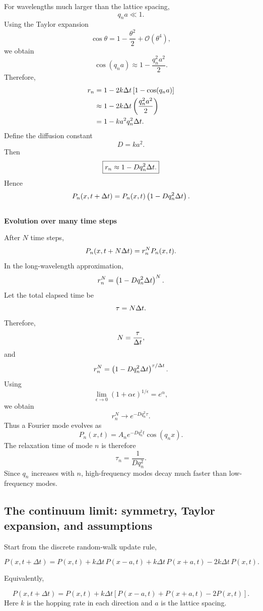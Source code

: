 For wavelengths much larger than the lattice spacing,
\[
    q_na \ll 1.
\]
Using the Taylor expansion
\[
    \cos\theta = 1 - \frac{\theta^2}{2} + \mathcal{O}(\theta^4),
\]
we obtain
\[
    \cos(q_na) \approx 1 - \frac{q_n^2a^2}{2}.
\]
Therefore,
\begin{align*}
    r_n &= 1 - 2k\Delta t \left[ 1-\cos(q_na) \right]
    \\
    &\approx 1 - 2k\Delta t \left( \frac{q_n^2a^2}{2} \right)
    \\
    &= 1-ka^2q_n^2\Delta t.
\end{align*}
Define the diffusion constant
\[
    \boxed{ D = ka^2. }
\]
Then
\[
    \boxed{ r_n \approx 1-Dq_n^2\Delta t. }
\]
Hence
\[
    P_n(x,t + \Delta t) = P_n(x,t) \left( 1 - Dq_n^2 \Delta t \right).
\]
% 
% 
\medskip
\\
\textbf{Evolution over many time steps}

After $N$ time steps,
% 
\[
    P_n(x,t+N\Delta t) = r_n^N P_n(x,t).
\]
% 
In the long-wavelength approximation,
% 
\[
    r_n^N = \left( 1-Dq_n^2\Delta t \right)^N.
\]
% 
Let the total elapsed time be
% 
\[
    \tau = N\Delta t.
\]
% 
Therefore,
% 
\[
    N = \frac{\tau}{\Delta t},
\]
% 
and
% 
\[
    r_n^N = \left( 1-Dq_n^2\Delta t \right)^{\tau/\Delta t}.
\]
% 
Using
% 
\[
    \lim_{\epsilon\rightarrow0} (1+\alpha\epsilon)^{1/\epsilon} = e^\alpha,
\]
% 
we obtain
% 
\[
    \boxed{ r_n^N \longrightarrow e^{-Dq_n^2\tau}. }
\]
% 
Thus a Fourier mode evolves as
% 
\[
    \boxed{ P_n(x,t) = A_n e^{-Dq_n^2t} \cos(q_nx). }
\]
% 
The relaxation time of mode $n$ is therefore
% 
\[
    \tau_n = \frac{1}{Dq_n^2}.
\]
% 
Since $q_n$ increases with $n$, high-frequency modes decay much faster than low-frequency modes.



\subsection{The continuum limit: symmetry, Taylor expansion, and assumptions}
\label{deriv:continuum}


Start from the discrete random-walk update rule,

\[
    P(x,t+\Delta t) = P(x,t) + k\Delta t\,P(x-a,t) + k\Delta t\,P(x+a,t) - 2k\Delta t\,P(x,t).
\]

Equivalently,

\[
    P(x,t+\Delta t) = P(x,t) + k\Delta t\left[P(x-a,t)+P(x+a,t)-2P(x,t)\right].
\]
Here $k$ is the hopping rate in each direction and $a$ is the lattice spacing.

